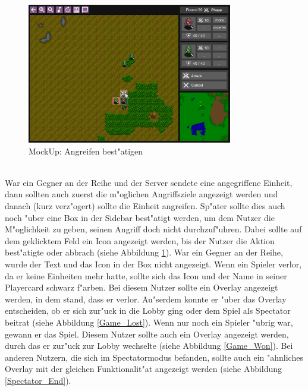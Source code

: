\documentclass[12pt, titlepage]{scrartcl}
\newcounter{subsubsubsection}[subsubsection]
\begin{document}
			        \begin{figure}[H] 
    				    \centering
    				    \includegraphics[width=0.8\textwidth]{images/mockUps/Attack.png}
    				    \caption{MockUp: Angreifen best"atigen}
    				    \label{Attack}
			        \end{figure}
		        	\ \\ War ein Gegner an der Reihe und der Server sendete eine angegriffene Einheit, dann sollten auch zuerst die m"oglichen Angriffsziele angezeigt werden und danach (kurz verz"ogert) sollte die Einheit angreifen. Sp"ater sollte dies auch noch "uber eine Box in der Sidebar best"atigt werden, um dem Nutzer die M"oglichkeit zu geben, seinen Angriff doch nicht durchzuf"uhren. Dabei sollte auf dem geklicktem Feld ein Icon angezeigt werden, bis der Nutzer die Aktion best"atigte oder abbrach (siehe Abbildung \ref{Attack}). War ein Gegner an der Reihe, wurde der Text und das Icon in der Box nicht angezeigt.
			        Wenn ein Spieler verlor, da er keine Einheiten mehr hatte, sollte sich das Icon und der Name in seiner Playercard schwarz f"arben. Bei diesem Nutzer sollte ein Overlay angezeigt werden, in dem stand, dass er verlor. Au"serdem konnte er "uber das Overlay entscheiden, ob er sich zur"uck in die Lobby ging oder dem Spiel als Spectator beitrat (siehe Abbildung \ref{Game_Lost}). Wenn nur noch ein Spieler "ubrig war, gewann er das Spiel. Diesem Nutzer sollte auch ein Overlay angezeigt werden, durch das er zur"uck zur Lobby wechselte (siehe Abbildung \ref{Game_Won}). Bei anderen Nutzern, die sich im Spectatormodus befanden, sollte auch ein "ahnliches Overlay mit der gleichen Funktionalit"at angezeigt werden (siehe Abbildung \ref{Spectator_End}).
\end{document}
